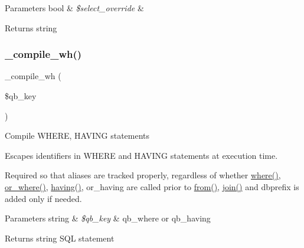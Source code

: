 \begin{DoxyParams}[1]{Parameters}
bool & {\em \$select\+\_\+override} & \\
\hline
\end{DoxyParams}
\begin{DoxyReturn}{Returns}
string 
\end{DoxyReturn}
\mbox{\label{class_c_i___d_b__query__builder_a3d2301b84734fd18a0db6d0602106f48}} 
\subsubsection{\texorpdfstring{\+\_\+compile\+\_\+wh()}{\_compile\_wh()}}
{\footnotesize\ttfamily \+\_\+compile\+\_\+wh (\begin{DoxyParamCaption}\item[{}]{\$qb\+\_\+key }\end{DoxyParamCaption})\hspace{0.3cm}{\ttfamily [protected]}}

Compile W\+H\+E\+RE, H\+A\+V\+I\+NG statements

Escapes identifiers in W\+H\+E\+RE and H\+A\+V\+I\+NG statements at execution time.

Required so that aliases are tracked properly, regardless of whether \mbox{\hyperlink{class_c_i___d_b__query__builder_a2356c4b7b93fb83c62a354a8a0748222}{where()}}, \mbox{\hyperlink{class_c_i___d_b__query__builder_a8d25e93a09f60fbe77541d0faef29bf0}{or\+\_\+where()}}, \mbox{\hyperlink{class_c_i___d_b__query__builder_af19efb51311e6f648a0035a0f94fceb6}{having()}}, or\+\_\+having are called prior to \mbox{\hyperlink{class_c_i___d_b__query__builder_a91f5f004ed8e2237a4decc5d23ac3457}{from()}}, \mbox{\hyperlink{class_c_i___d_b__query__builder_a54557b1ef757507cbbd2a8802a99810b}{join()}} and dbprefix is added only if needed.


\begin{DoxyParams}[1]{Parameters}
string & {\em \$qb\+\_\+key} & \textquotesingle{}qb\+\_\+where\textquotesingle{} or \textquotesingle{}qb\+\_\+having\textquotesingle{} \\
\hline
\end{DoxyParams}
\begin{DoxyReturn}{Returns}
string S\+QL statement 
\end{DoxyReturn}
\mbox{\label{class_c_i___d_b__query__builder_a194edea7be9a8636b67b7d2c8a3de04e}} 
